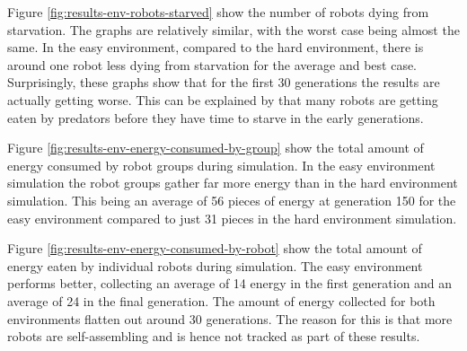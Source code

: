 \vspace*{\fill}
\newpage
\vspace*{\fill}


Figure \ref{fig:results-env-robots-starved} show the number of robots dying from starvation.
The graphs are relatively similar, with the worst case being almost the same.
In the easy environment, compared to the hard environment, there is around one robot less dying from starvation for the average and best case.
Surprisingly, these graphs show that for the first 30 generations the results are actually getting worse.
This can be explained by that many robots are getting eaten by predators before they have time to starve in the early generations.  

\vspace*{\fill}
\newpage
\vspace*{\fill}


Figure \ref{fig:results-env-energy-consumed-by-group} show the total amount of energy consumed by robot groups during simulation.
In the easy environment simulation the robot groups gather far more energy than in the hard environment simulation.
This being an average of 56 pieces of energy at generation 150 for the easy environment compared to just 31 pieces in the hard environment simulation.

\vspace*{\fill}
\newpage
\vspace*{\fill}


Figure \ref{fig:results-env-energy-consumed-by-robot} show the total amount of energy eaten by individual robots during simulation.
The easy environment performs better, collecting an average of 14 energy in the first generation and an average of 24 in the final generation.
The amount of energy collected for both environments flatten out around 30 generations.
The reason for this is that more robots are self-assembling and is hence not tracked as part of these results.

